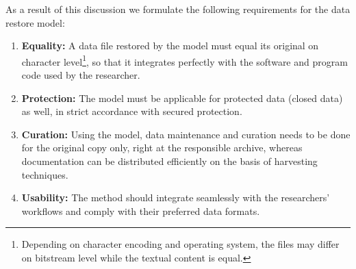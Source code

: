 \documentclass{acm_proc_article-sp}
\begin{document}
As a result of this discussion we formulate the following requirements for the data restore model:



\begin{enumerate}\label{reqlist}
	
  \item \textbf{Equality:} A data file restored by the model must equal its original on character level\footnote{Depending on character encoding and operating system, the files may differ on bitstream level while the textual content is equal.}, so that it integrates perfectly with the software and program code used by the researcher.
  
  \item \textbf{Protection:} The model must be applicable for protected data (closed data) as well, in strict accordance with secured protection.
 
  \item \textbf{Curation:} Using the model, data maintenance and curation needs to be done for the original copy only, right at the responsible archive, whereas documentation can be distributed efficiently on the basis of harvesting techniques.

  
  \item \textbf{Usability:} The method should integrate seamlessly with the researchers' workflows and comply with their preferred data formats. 
  

\end{enumerate}
\end{document}
